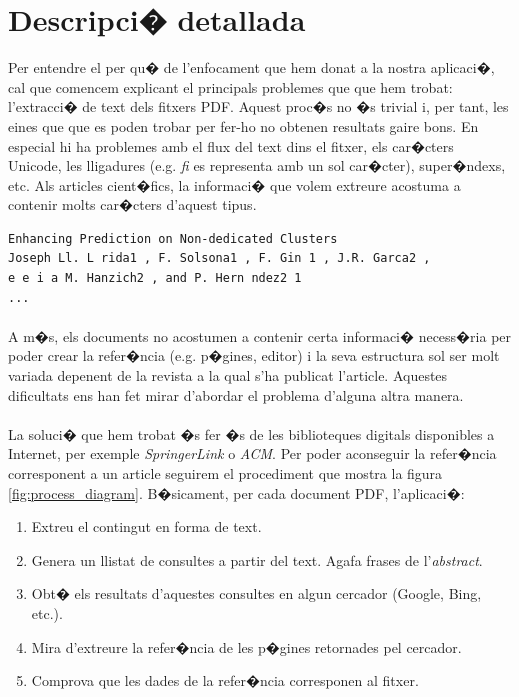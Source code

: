 \documentclass[a4paper,oneside]{article}
\begin{document}
\section{Descripci� detallada}
Per entendre el per qu� de l'enfocament que hem donat a la nostra aplicaci�, cal que comencem explicant el principals problemes que que hem trobat: l'extracci� de text dels fitxers PDF. Aquest proc�s no �s trivial i, per tant, les eines que que es poden trobar per fer-ho no obtenen resultats gaire bons. En especial hi ha problemes amb el flux del text dins el fitxer, els car�cters Unicode, les lligadures (e.g. \textit{fi} es representa amb un sol car�cter), super�ndexs, etc. Als articles cient�fics, la informaci� que volem extreure acostuma a contenir molts car�cters d'aquest tipus.

\begin{center}
\begin{lstlisting}[caption={Part del text extret d'un article}]
Enhancing Prediction on Non-dedicated Clusters
Joseph Ll. L rida1 , F. Solsona1 , F. Gin 1 , J.R. Garca2 ,
e e i a M. Hanzich2 , and P. Hern ndez2 1
...
\end{lstlisting}
\end{center}

\paragraph{}
A m�s, els documents no acostumen a contenir certa informaci� necess�ria per poder crear la refer�ncia (e.g. p�gines, editor) i la seva estructura sol ser molt variada depenent de la revista a la qual s'ha publicat l'article. Aquestes dificultats ens han fet mirar d'abordar el problema d'alguna altra manera.

\paragraph{}
La soluci� que hem trobat �s fer �s de les biblioteques digitals disponibles a Internet, per exemple \textit{SpringerLink} o \textit{ACM}. Per poder aconseguir la refer�ncia corresponent a un article seguirem el procediment que mostra la figura \ref{fig:process_diagram}. B�sicament, per cada document PDF, l'aplicaci�:
\begin{enumerate}
    \item{Extreu el contingut en forma de text.}
    \item{Genera un llistat de consultes a partir del text. Agafa frases de l'\textit{abstract}.}
    \item{Obt� els resultats d'aquestes consultes en algun cercador (Google, Bing, etc.).}
    \item{Mira d'extreure la refer�ncia de les p�gines retornades pel cercador.}
    \item{Comprova que les dades de la refer�ncia corresponen al fitxer.}
\end{enumerate}
\end{document}
